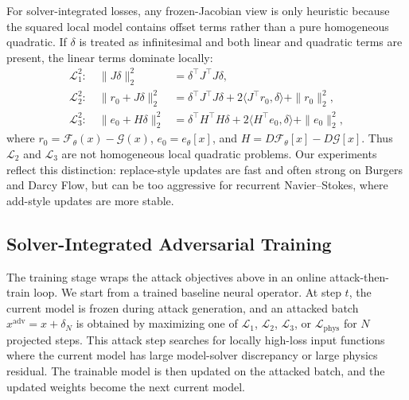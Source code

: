 \documentclass[letterpaper]{article} %
\begin{document}
For solver-integrated losses, any frozen-Jacobian view is only heuristic because
the squared local model contains offset terms rather than a pure homogeneous
quadratic. If $\delta$ is treated as infinitesimal and both linear and
quadratic terms are present, the linear terms dominate locally:
\begin{align}
  \mathcal{L}_1^2:\quad
  \|J\delta\|_2^2
  &=
  \delta^\top J^\top J\delta,
  \nonumber\\
  \mathcal{L}_2^2:\quad
  \|r_0+J\delta\|_2^2
  &=
  \delta^\top J^\top J\delta
  +2\langle J^\top r_0,\delta\rangle+\|r_0\|_2^2,
  \nonumber\\
  \mathcal{L}_3^2:\quad
  \|e_0+H\delta\|_2^2
  &=
  \delta^\top H^\top H\delta
  +2\langle H^\top e_0,\delta\rangle+\|e_0\|_2^2,
\end{align}
where $r_0=\mathcal{F}_\theta(x)-\mathcal{G}(x)$,
$e_0=e_\theta[x]$, and $H=D\mathcal{F}_\theta[x]-D\mathcal{G}[x]$.
Thus $\mathcal{L}_2$ and $\mathcal{L}_3$ are not homogeneous local quadratic
problems. Our experiments reflect this distinction: replace-style updates are
fast and often strong on Burgers and Darcy Flow, but can be too aggressive for
recurrent Navier--Stokes, where add-style updates are more stable.

\subsection{Solver-Integrated Adversarial Training}

The training stage wraps the attack objectives above in an online
attack-then-train loop. We start from a trained baseline neural operator. At
step $t$, the current model is frozen during attack generation, and an attacked
batch $x^{\mathrm{adv}}=x+\delta_N$ is obtained by maximizing one of
$\mathcal{L}_1$, $\mathcal{L}_2$, $\mathcal{L}_3$, or
$\mathcal{L}_{\mathrm{phys}}$ for $N$ projected steps. This attack step searches
for locally high-loss input functions where the current model has large
model-solver discrepancy or large physics residual. The trainable model is
then updated on the attacked batch, and the updated weights become the next
current model.
\end{document}
